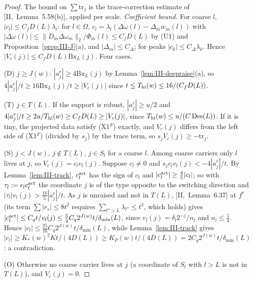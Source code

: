 \documentclass[10pt]{amsart}
\theoremstyle{definition}
\theoremstyle{remark}
\begin{document}
\begin{proof}
The bound on $\sum\mathrm{tr}_j$ is the trace-correction estimate of
[II,~Lemma~5.58(b)], applied per scale.  \emph{Coefficient bound.}  For coarse
$l$, $|c_l|\le C_fD(L)\lambda_l$: for $l\in\Omega$, $c_l=\lambda_l(\Delta\omega(l)
-\Delta_mw_m(l))$ with $|\Delta\omega(l)|\le\|D_m\Delta\omega_m\|_2/\Phi_m(l)\le
C_fD(L)$ by (U1) and Proposition~\ref{prop:III-J}(a), and $|\Delta_m|\le
C_\Delta$; for peaks $|c_k|\le C_\Delta\lambda_k$.  Hence $|V_c(j)|\le C_fD(L)
\mathrm{Bx}_L(j)$.  Four cases.

(D) $j\ge J(w)$: $|a^r_j|\ge4\mathrm{Bx}_L(j)$ by Lemma~\ref{lem:III-deepraise}(a),
so $4|a^r_j|/t\ge16\mathrm{Bx}_L(j)/t\ge|V_c(j)|$ since $t\le T_{\rm hi}(w)\le
16/(C_fD(L))$.

(T) $j\in T(L)$.  If the support is robust, $|a^r_j|\ge u/2$ and $4|a^r_j|/t\ge
2u/T_{\rm hi}(w)\ge C_fD(L)\ge|V_c(j)|$, since $T_{\rm hi}(w)\le u/(C\,
\mathrm{Des}(L))$.  If it is tiny, the projected data satisfy (X1$^F$) exactly,
and $V_c(j)$ differs from the left side of (X1$^F$) (divided by $s_j$) by the
trace term, so $s_jV_c(j)\ge-\mathrm{tr}_j$.

(S) $j<J(w)$, $j\notin T(L)$, $j\in S_l$ for a coarse $l$.  Among coarse
carriers only $l$ lives at $j$, so $V_c(j)=c_lv_l(j)$.  Suppose $c_l\ne0$ and
$s_jc_lv_l(j)<-4|a^r_j|/t$.  By Lemma~\ref{lem:III-track}, $c^{\rm act}_l$ has the
sign of $c_l$ and $|c^{\rm act}_l|\ge\frac45|c_l|$; so with $\tau_l:=\epsilon_l
c^{\rm act}_l$ the coordinate $j$ is of the type opposite to the switching
direction and $|\tau_l|v_l(j)>\frac{16}5|a^r_j|/t$.  As $j$ is unraised and not
in $T(L)$, [II,~Lemma~6.37] at $f^r$ (its term $\sum|r_s|\le8t^2$ requires
$\sum_{l''>L}\lambda_{l''}\le t^3$, which holds) gives $|c^{\rm act}_l|\le
C_qt/v_l(j)\le\frac54C_q2^{J(w)}t/\delta_{\min}(L)$, since $v_l(j)=\delta_l2^{-j}
/n_l$ and $n_l\le\frac54$.  Hence $|c_l|\le\frac{25}{16}C_q2^{J(w)}t/
\delta_{\min}(L)$, while Lemma~\ref{lem:III-track} gives $|c_l|\ge K_*(w)^2Kt/
(4D(L))\ge K_P(w)t/(4D(L))=2C_q2^{J(w)}t/\delta_{\min}(L)$: a contradiction.

(O) Otherwise no coarse carrier lives at $j$ (a coordinate of $S_l$ with $l>L$
is not in $T(L)$), and $V_c(j)=0$.
\end{proof}
\end{document}
